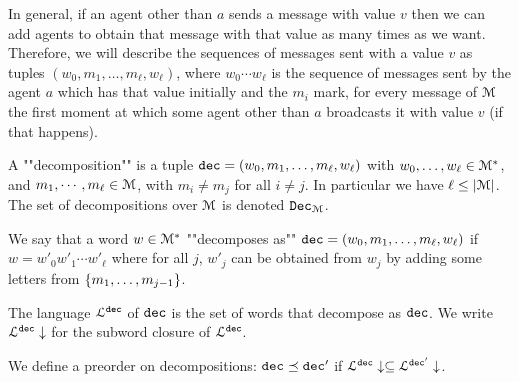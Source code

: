 In general, if an agent other than $a$ sends a message with value $v$ then we can add agents to obtain that message with that value as many times as we want.
Therefore, we will describe the sequences of messages sent with a value $v$ as tuples $(w_0, m_1, \ldots, m_\ell, w_\ell)$, where $w_0\cdots w_\ell$ is the sequence of messages sent by the agent $a$ which has that value initially and the $m_i$ mark, for every message of $\mathcal{M}$ the first moment at which some agent other than $a$ broadcasts it with value $v$ (if that happens).

\begin{definition}
	A ""decomposition"" is a tuple $\mathtt{dec} = (w_0, m_1, \ldots, m_\ell, w_\ell)$ with $w_0, \ldots, w_\ell \in \mathcal{M}^*$, and $m_1, \cdots, m_\ell \in \mathcal{M}$, with $m_i \neq m_j$ for all $i\neq j$. In particular we have $\ell \leq |\mathcal{M}|$. The set of decompositions over $\mathcal{M}$ is denoted $\mathtt{Dec}_{\mathcal{M}}$.
	
	We say that a word $w \in \mathcal{M}^*$ ""decomposes as"" $\mathtt{dec} = (w_0, m_1, \ldots, m_\ell, w_\ell)$ if $w = w'_0 w'_1 \cdots w'_\ell$ where for all $j$, $w'_j$ can be obtained from $w_j$ by adding some letters from $\{m_1, \ldots, m_{j-1}\}$.
	
	The language $\mathcal{L}^{\mathtt{\mathtt{dec}}}$ of $\mathtt{dec}$ is the set of words that decompose as $\mathtt{dec}$. We write $\mathcal{L}^{\mathtt{\mathtt{dec}}}\downarrow$ for the subword closure of $\mathcal{L}^{\mathtt{\mathtt{dec}}}$.
	
	We define a preorder on decompositions:
	$\mathtt{dec} \preceq \mathtt{dec}'$ if $\mathcal{L}^{\mathtt{\mathtt{dec}}}\downarrow \subseteq \mathcal{L}^{\mathtt{\mathtt{dec}'}}\downarrow$.
\end{definition}


